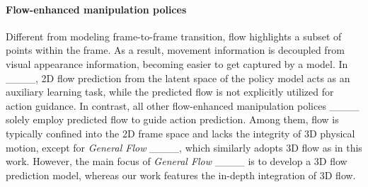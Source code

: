 \paragraph{Flow-enhanced manipulation polices}
Different from modeling frame-to-frame transition, flow highlights a subset of points within the frame. As a result, movement information is decoupled from visual appearance information, becoming easier to get captured by a model. In ____, 2D flow prediction from the latent space of the policy model acts as an auxiliary learning task, while the predicted flow is not explicitly utilized for action guidance. In contrast, all other flow-enhanced manipulation polices ____ solely employ predicted flow to guide action prediction. Among them, flow is typically confined into the 2D frame space and lacks the integrity of 3D physical motion, except for \emph{General Flow} ____, which similarly adopts 3D flow as in this work. However, the main focus of \emph{General Flow} ____ is to develop a 3D flow prediction model, whereas our work features the in-depth integration of 3D flow.